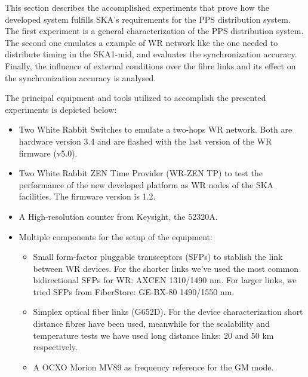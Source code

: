 
This section describes the accomplished experiments that prove how the 
developed system fulfills SKA's requirements for the PPS distribution system. 
 The first experiment is a general 
characterization of the PPS distribution system. The second one emulates a 
example of WR network like the one needed to distribute timing in the SKA1-mid, 
and evaluates the synchronization accuracy. Finally, the influence of external 
conditions over the fibre links and its effect on the synchronization accuracy 
is analysed.

The principal equipment and tools utilized to accomplish the presented 
experiments is depicted below:

\begin{itemize}
    \item Two White Rabbit Switches to emulate a two-hops WR network. Both are 
    hardware version 3.4 and are flashed with the last version of the WR 
    firmware (v5.0).
    
    \item Two White Rabbit ZEN Time Provider (WR-ZEN TP) to test the 
    performance 
    of the new developed platform as WR nodes of the SKA facilities. The 
    firmware version is 1.2.
    
    \item A High-resolution counter from Keysight, the 52320A.
    
    \item Multiple components for the setup of the equipment:
    \begin{itemize}
        \item Small form-factor pluggable transceptors (SFPs) to stablish the 
        link between WR devices. For the shorter links we've used the most 
        common bidirectional SFPs for WR: AXCEN 1310/1490 nm. For larger links, 
        we tried 
        SFPs from FiberStore: GE-BX-80 1490/1550 nm.
        \item Simplex optical fiber links (G652D). For the device 
        characterization short distance fibres have been used, meanwhile for 
        the scalability and temperature tests we have used long distance links: 
        20 and 50 km respectively.
        \item A OCXO Morion MV89 as frequency reference for the GM mode.
    \end{itemize}
    
\end{itemize}

